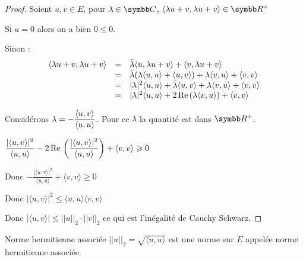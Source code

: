 \begin{proof}
    Soient $u, v \in E$, pour $\lambda \in \C$, $\langle\lambda u + v, \lambda u + v\rangle \in \R^+ $

    Si $u = 0$ alors on a bien $0 \leqslant 0$.

    Sinon :
    \[
    \begin{array}{rcl}
        \langle\lambda u + v, \lambda u + v\rangle & = & \bar \lambda \langle u, \lambda u + v \rangle + \langle v, \lambda u + v\rangle \\
        \space & = & \bar \lambda (\lambda \langle u, u \rangle + \langle u, v \rangle ) + \lambda \langle v, u \rangle + \langle v, v \rangle \\
        \space & = & |\lambda|^2 \langle u, u \rangle + \bar \lambda  \langle u, v \rangle + \lambda \langle v, u \rangle + \langle v, v \rangle \\
        \space & = & |\lambda|^2 \langle u, u \rangle + 2 \operatorname{Re} \,(\lambda \langle v, u \rangle) + \langle v, v \rangle \\
    \end{array}
    \]

    Considérons $\displaystyle \lambda = - \frac{\langle u, v \rangle }{\langle u, u \rangle}$. Pour ce $\lambda$ la quantité est dans
    $\R^+$.

    $\displaystyle \frac{|\langle u, v \rangle|^2}{\langle u, u \rangle} - 2 \operatorname{Re} \, \left(\frac{|\langle u, v \rangle|^2}{\langle u, u \rangle}\right) + \langle v, v \rangle \geqslant 0$

    Donc $\displaystyle - \frac{|\langle u, v \rangle|^2}{\langle u, u \rangle} + \langle v, v \rangle \geqslant 0$

    Donc $|\langle u, v \rangle|^2 \leqslant \langle u, u \rangle \langle v, v \rangle$

    Donc $|\langle u, v \rangle| \leqslant ||u||_2 \cdot ||v||_2$ ce qui est l'inégalité de Cauchy Schwarz. 
\end{proof}

\begin{theoreme}{Norme hermitienne associée}{}
    $||u||_2 = \sqrt{\langle u, u \rangle}$ est une norme sur $E$ appelée norme hermitienne associée. 
\end{theoreme}

